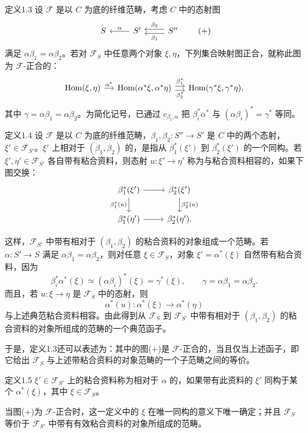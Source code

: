 \begin{statement}{定义1.3}
设 $\mathcal F$ 是以 $C$ 为底的纤维范畴，考虑 $C$ 中的态射图
\[
\begin{tikzcd}
S&S'\arrow[l,"\alpha"']&S''\arrow[l,shift left=.6ex,"\beta_1"]\arrow[l,shift right=.6ex,"\beta_2"']
\end{tikzcd}\tag{+}
\]
满足 $\alpha\beta_1=\alpha\beta_2$。若对 $\mathcal F_S$ 中任意两个对象 $\xi,\eta$，下列集合映射图正合，就称此图为 $\mathcal F$-正合的：
\[
\begin{tikzcd}[column sep=small]
\operatorname{Hom}(\xi,\eta)\arrow[r,"\alpha^*"]&
\operatorname{Hom}(\alpha^*\xi,\alpha^*\eta)\arrow[r,shift left=.6ex,"\beta_1^*"]\arrow[r,shift right=.6ex,"\beta_2^*"']&
\operatorname{Hom}(\gamma^*\xi,\gamma^*\eta),
\end{tikzcd}
\]
其中 $\gamma=\alpha\beta_1=\alpha\beta_2$。为简化记号，已通过 $c_{\beta_i,\alpha}$ 把 $\beta_i^*\alpha^*$ 与 $(\alpha\beta_i)^*=\gamma^*$ 等同。
\end{statement}
\begin{statement}{定义1.4}
设 $\mathcal F$ 是以 $C$ 为底的纤维范畴，$\beta_1,\beta_2:S''\to S'$ 是 $C$ 中的两个态射，$\xi'\in\mathcal F_{S'}$。$\xi'$ 上相对于 $(\beta_1,\beta_2)$ 的，是指从 $\beta_1^*(\xi')$ 到 $\beta_2^*(\xi')$ 的一个同构。若 $\xi',\eta'\in\mathcal F_{S'}$ 各自带有粘合资料，则态射 $u:\xi'\to\eta'$ 称为与粘合资料相容的，如果下图交换：
\[
\begin{tikzcd}
\beta_1^*(\xi')\arrow[r]\arrow[d,"\beta_1^*(u)"']&\beta_2^*(\xi')\arrow[d,"\beta_2^*(u)"]\\
\beta_1^*(\eta')\arrow[r]&\beta_2^*(\eta').
\end{tikzcd}
\]
\end{statement}
这样，$\mathcal F_{S'}$ 中带有相对于 $(\beta_1,\beta_2)$ 的粘合资料的对象组成一个范畴。若 $\alpha:S'\to S$ 满足 $\alpha\beta_1=\alpha\beta_2$，则对任意 $\xi\in\mathcal F_S$，对象 $\xi'=\alpha^*(\xi)$
自然带有粘合资料，因为
\[
\beta_i^*\alpha^*(\xi)\simeq(\alpha\beta_i)^*(\xi)=\gamma^*(\xi),
\qquad\gamma=\alpha\beta_1=\alpha\beta_2.
\]
而且，若 $u:\xi\to\eta$ 是 $\mathcal F_S$ 中的态射，则
\[
\alpha^*(u):\alpha^*(\xi)\longrightarrow\alpha^*(\eta)
\]
与上述典范粘合资料相容。由此得到从 $\mathcal F_S$ 到 $\mathcal F_{S'}$ 中带有相对于 $(\beta_1,\beta_2)$ 的粘合资料的对象所组成的范畴的一个典范函子。

于是，定义1.3还可以表述为：其中的图(+)是 $\mathcal F$-正合的，当且仅当上述函子，即它给出 $\mathcal F_S$ 与上述带粘合资料的对象范畴的一个子范畴之间的等价。
\begin{statement}{定义1.5}
$\xi'\in\mathcal F_{S'}$ 上的粘合资料称为相对于 $\alpha$ 的，如果带有此资料的 $\xi'$ 同构于某个 $\alpha^*(\xi)$，其中 $\xi\in\mathcal F_S$。
\end{statement}
当图(+)为 $\mathcal F$-正合时，这一定义中的 $\xi$ 在唯一同构的意义下唯一确定；并且 $\mathcal F_S$ 等价于 $\mathcal F_{S'}$ 中带有有效粘合资料的对象所组成的范畴。

